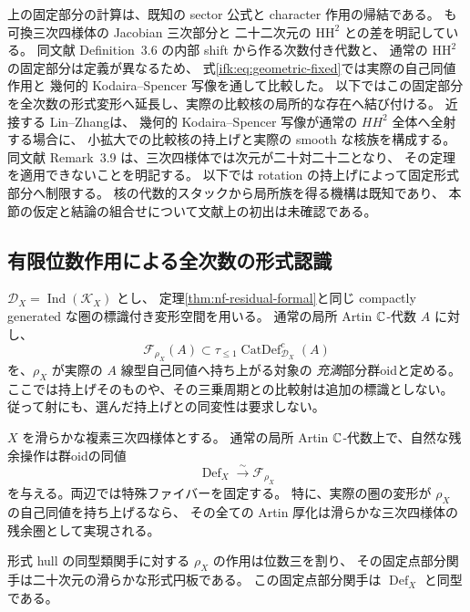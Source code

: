 \begin{remark}[既知計算との関係]
\label{ifk:rem:known-calculation}
上の固定部分の計算は、既知の sector 公式と character 作用の帰結である。
\cite[Proposition~3.5 and Remark~3.8]{NFHuybrechtsRennemo}も
可換三次四様体の Jacobian 三次部分と
二十二次元の $\mathrm{HH}^2$ との差を明記している。
同文献 Definition~3.6 の内部 shift から作る次数付き代数と、
通常の $\mathrm{HH}^2$ の固定部分は定義が異なるため、
式\eqref{ifk:eq:geometric-fixed}では実際の自己同値作用と
幾何的 Kodaira--Spencer 写像を通して比較した。
以下ではこの固定部分を全次数の形式変形へ延長し、実際の比較核の局所的な存在へ結び付ける。
近接する Lin--Zhang\cite[Theorem~2.2, Proposition~2.4]{NFMLinZhangPartners}は、
幾何的 Kodaira--Spencer 写像が通常の $HH^2$ 全体へ全射する場合に、
小拡大での比較核の持上げと実際の smooth な核族を構成する。
同文献 Remark~3.9 は、三次四様体では次元が二十対二十二となり、
その定理を適用できないことを明記する。
以下では rotation の持上げによって固定形式部分へ制限する。
核の代数的スタックから局所族を得る機構は既知であり、
本節の仮定と結論の組合せについて文献上の初出は未確認である。
\end{remark}

\subsection{有限位数作用による全次数の形式認識}

$\mathcal D_X=\operatorname{Ind}(\mathcal K_X)$ とし、
定理\ref{thm:nf-residual-formal}と同じ
compactly generated な圏の標識付き変形空間を用いる。
通常の局所 Artin $\mathbb C$-代数 $A$ に対し、
\[
 \mathcal F_{\rho_X}(A)\subset
   \tau_{\le1}\operatorname{CatDef}^c_{\mathcal D_X}(A)
\]
を、$\rho_X$ が実際の $A$ 線型自己同値へ持ち上がる対象の
\emph{充満}部分群oidと定める。
ここでは持上げそのものや、その三乗周期との比較射は追加の標識としない。
従って射にも、選んだ持上げとの同変性は要求しない。

\begin{theorem}
\label{ifk:thm:rotation-formal}
$X$ を滑らかな複素三次四様体とする。
通常の局所 Artin $\mathbb C$-代数上で、自然な残余操作は群oidの同値
\begin{equation}\label{ifk:eq:formal-recognition}
       \operatorname{Def}_X\xrightarrow{\sim}\mathcal F_{\rho_X}
\end{equation}
を与える。両辺では特殊ファイバーを固定する。
特に、実際の圏の変形が $\rho_X$ の自己同値を持ち上げるなら、
その全ての Artin 厚化は滑らかな三次四様体の残余圏として実現される。

形式 hull の同型類関手に対する $\rho_X$ の作用は位数三を割り、
その固定点部分関手は二十次元の滑らかな形式円板である。
この固定点部分関手は $\operatorname{Def}_X$ と同型である。
\end{theorem}

